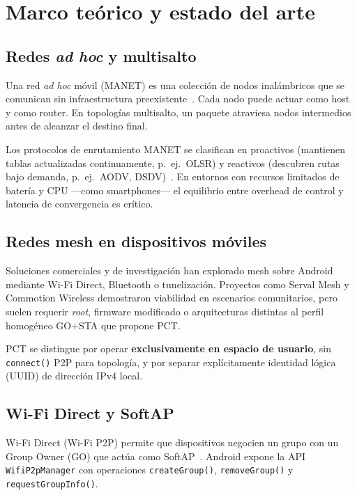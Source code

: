 \chapter{Marco teórico y estado del arte}
\label{cap:marco-teorico}

\section{Redes \emph{ad hoc} y multisalto}
\label{sec:ad-hoc}

Una red \emph{ad hoc} móvil (MANET) es una colección de nodos inalámbricos que se comunican sin infraestructura preexistente~\cite{perkins2003adhoc}. Cada nodo puede actuar como host y como router. En topologías multisalto, un paquete atraviesa nodos intermedios antes de alcanzar el destino final.

Los protocolos de enrutamiento MANET se clasifican en proactivos (mantienen tablas actualizadas continuamente, p.\ ej.\ OLSR) y reactivos (descubren rutas bajo demanda, p.\ ej.\ AODV, DSDV)~\cite{rfc3561}. En entornos con recursos limitados de batería y CPU ---como smartphones--- el equilibrio entre overhead de control y latencia de convergencia es crítico.

\section{Redes mesh en dispositivos móviles}
\label{sec:mesh-moviles}

Soluciones comerciales y de investigación han explorado mesh sobre Android mediante Wi-Fi Direct, Bluetooth o tunelización. Proyectos como Serval Mesh y Commotion Wireless demostraron viabilidad en escenarios comunitarios, pero suelen requerir \emph{root}, firmware modificado o arquitecturas distintas al perfil homogéneo GO+STA que propone PCT.

PCT se distingue por operar \textbf{exclusivamente en espacio de usuario}, sin \texttt{connect()} P2P para topología, y por separar explícitamente identidad lógica (UUID) de dirección IPv4 local.

\section{Wi-Fi Direct y SoftAP}
\label{sec:wifi-direct}

Wi-Fi Direct (Wi-Fi P2P) permite que dispositivos negocien un grupo con un Group Owner (GO) que actúa como SoftAP~\cite{wifidirect2010}. Android expone la API \texttt{WifiP2pManager} con operaciones \texttt{createGroup()}, \texttt{removeGroup()} y \texttt{requestGroupInfo()}.

